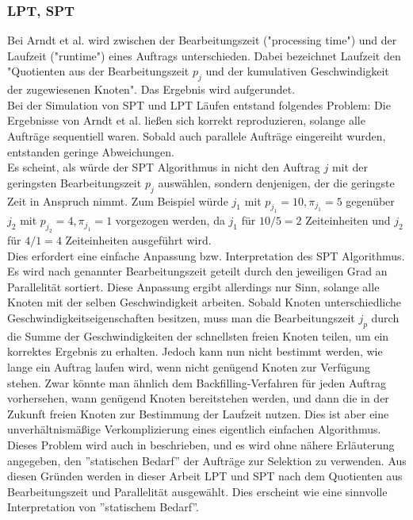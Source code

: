 \subsubsection{LPT, SPT}
\label{spt-lpt-time}
Bei Arndt et al. \cite[p.~98]{Arn99} wird zwischen der Bearbeitungszeit ("processing time") und der Laufzeit ("runtime") eines Auftrags unterschieden. Dabei bezeichnet Laufzeit den "Quotienten aus der Bearbeitungszeit $p_j$ und der kumulativen Geschwindigkeit der zugewiesenen Knoten". Das Ergebnis wird aufgerundet.\\
Bei der Simulation von SPT und LPT Läufen entstand folgendes Problem: Die Ergebnisse von Arndt et al. \cite{Arn99} ließen sich korrekt reproduzieren, solange alle Aufträge sequentiell waren. Sobald auch parallele Aufträge eingereiht wurden, entstanden geringe Abweichungen.\\
Es scheint, als würde der SPT Algorithmus in \cite{Arn99} nicht den Auftrag $j$ mit der geringsten Bearbeitungszeit $p_j$ auswählen, sondern denjenigen, der die geringste Zeit in Anspruch nimmt. Zum Beispiel würde $j_1$ mit $p_{j_1} = 10, \pi_{j_1} = 5$ gegenüber $j_2$ mit $p_{j_2} = 4, \pi_{j_1} = 1$ vorgezogen werden, da $j_1$ für $10/5 = 2$  Zeiteinheiten und $j_2$ für $4/1 = 4$ Zeiteinheiten ausgeführt wird.\\
Dies erfordert eine einfache Anpassung bzw. Interpretation des SPT Algorithmus. Es wird nach genannter Bearbeitungszeit geteilt durch den jeweiligen Grad an Parallelität sortiert. Diese Anpassung ergibt allerdings nur Sinn, solange alle Knoten mit der selben Geschwindigkeit arbeiten. Sobald Knoten unterschiedliche Geschwindigkeitseigenschaften besitzen, muss man die Bearbeitungszeit $j_p$ durch die Summe der Geschwindigkeiten der schnellsten freien Knoten teilen, um ein korrektes Ergebnis zu erhalten. Jedoch kann nun nicht bestimmt werden, wie lange ein Auftrag laufen wird, wenn nicht genügend Knoten zur Verfügung stehen. Zwar könnte man ähnlich dem Backfilling-Verfahren für jeden Auftrag vorhersehen, wann genügend Knoten bereitstehen werden, und dann die in der Zukunft freien Knoten zur Bestimmung der Laufzeit nutzen. Dies ist aber eine unverhältnismäßige Verkomplizierung eines eigentlich einfachen Algorithmus.\\
Dieses Problem wird auch in \cite[p.~98]{Arn99} beschrieben, und es wird ohne nähere Erläuterung angegeben, den ''statischen Bedarf'' der Aufträge zur Selektion zu verwenden. Aus diesen Gründen werden in dieser Arbeit LPT und SPT nach dem Quotienten aus Bearbeitungszeit und Parallelität ausgewählt. Dies erscheint wie eine sinnvolle Interpretation von ''statischem Bedarf''.
